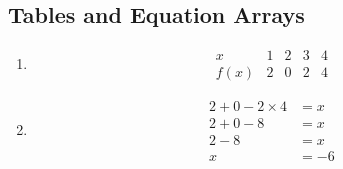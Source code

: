 \documentclass{article}
\begin{document}
\subsection{Tables and Equation Arrays}
\begin{enumerate}
    \item 
    \[
    \begin{array}{c|c|c|c|c}
    x & 1 & 2 & 3 & 4 \\
    \hline
    f(x) & 2 & 0 & 2 & 4
    \end{array}
    \]

    \item 
    \begin{align}
    2 + 0 - 2 \times 4 &= x \\
    2 + 0 - 8 &= x \\
    2 - 8 &= x \\
    x &= -6
    \end{align}
\end{enumerate}
\end{document}
